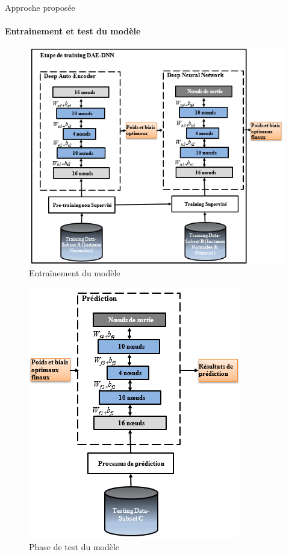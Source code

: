 \documentclass[aspectratio=169,professionalfonts, 12pt]{beamer}
\begin{document}
\begin{frame}{Approche proposée}
	\framesubtitle{Entrainement et test du modèle }
\begin{minipage}{0.4\textwidth}
	\begin{figure}[t]
	       \centering
 \includegraphics[height=0.7\textheight]{images/Training}
 			\caption{Entraînement du modèle}
	    \end{figure}
\end{minipage}
	\begin{minipage}{0.5\textwidth}
  	\begin{figure}[t]
	       \centering
 \includegraphics[height=0.7\textheight]{images/testing}
 			\caption{Phase de test du modèle} 
	    \end{figure}
\end{minipage}
\end{frame}
\end{document}
